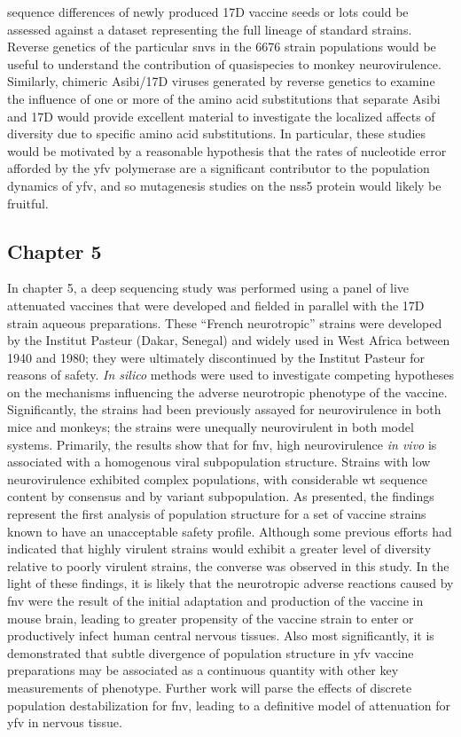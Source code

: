 sequence differences of newly produced 17D vaccine seeds or lots could be assessed against a dataset representing the full lineage of standard strains. Reverse genetics of the particular \glspl{snv} in the 6676 strain populations would be useful to understand the contribution of quasispecies to monkey neurovirulence. Similarly, chimeric Asibi/17D viruses generated by reverse genetics to examine the influence of one or more of the amino acid substitutions that separate Asibi and 17D would provide excellent material to investigate the localized affects of diversity due to specific amino acid substitutions. In particular, these studies would be motivated by a reasonable hypothesis that the rates of nucleotide error afforded by the \gls{yfv} polymerase are a significant contributor to the population dynamics of \gls{yfv}, and so mutagenesis studies on the \glspl{ns}5 protein would likely be fruitful.
\subsection{Chapter 5}
In chapter 5, a deep sequencing study was performed using a panel of live attenuated vaccines that were developed and fielded in parallel with the 17D strain aqueous preparations. These “French neurotropic” strains were developed by the Institut Pasteur (Dakar, Senegal) and widely used in West Africa between 1940 and 1980; they were ultimately discontinued by the Institut Pasteur for reasons of safety. \emph{In silico} methods were used to investigate competing hypotheses on the mechanisms influencing the adverse neurotropic phenotype of the vaccine. Significantly, the strains had been previously assayed for neurovirulence in both mice and monkeys; the strains were unequally neurovirulent in both model systems. Primarily, the results show that for \gls{fnv}, high neurovirulence \emph{in vivo} is associated with a homogenous viral subpopulation structure. Strains with low neurovirulence exhibited complex populations, with considerable \gls{wt} sequence content by consensus and by variant subpopulation. As presented, the findings represent the first analysis of population structure for a set of vaccine strains known to have an unacceptable safety profile. Although some previous efforts had indicated that highly virulent strains would exhibit a greater level of diversity relative to poorly virulent strains, the converse was observed in this study. In the light of these findings, it is likely that the neurotropic adverse reactions caused by \gls{fnv} were the result of the initial adaptation and production of the vaccine in mouse brain, leading to greater propensity of the vaccine strain to enter or productively infect human central nervous tissues. Also most significantly, it is demonstrated that subtle divergence of population structure in \gls{yfv} vaccine preparations may be associated as a continuous quantity with other key measurements of phenotype. Further work will parse the effects of discrete population destabilization for \gls{fnv}, leading to a definitive model of attenuation for \gls{yfv} in nervous tissue.
